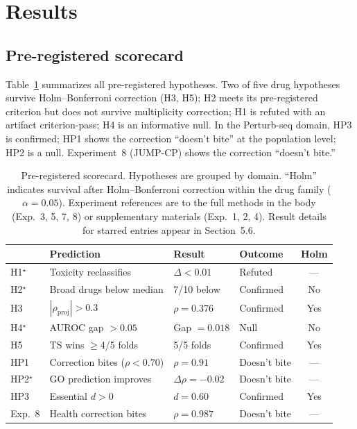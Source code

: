 \documentclass{article}
\begin{document}
\section{Results}

\subsection{Pre-registered scorecard}

Table~\ref{tab:scorecard} summarizes all pre-registered hypotheses.
Two of five drug hypotheses survive Holm--Bonferroni correction (H3, H5);
H2 meets its pre-registered criterion but does not survive multiplicity
correction; H1 is refuted with an artifact criterion-pass; H4 is an
informative null.
In the Perturb-seq domain, HP3 is confirmed; HP1 shows the correction
``doesn't bite'' at the population level; HP2 is a null. Experiment~8
(JUMP-CP) shows the correction ``doesn't bite.''

\begin{table}[t]
\centering
\caption{Pre-registered scorecard. Hypotheses are grouped by domain.
``Holm'' indicates survival after Holm--Bonferroni correction within
the drug family ($\alpha = 0.05$). Experiment references are to the
full methods in the body (Exp.~3, 5, 7, 8) or supplementary materials
(Exp.~1, 2, 4). Result details for starred entries appear in Section~5.6.}
\label{tab:scorecard}
\small
\begin{tabular}{llllc}
\toprule
 & Prediction & Result & Outcome & Holm \\
\midrule
H1$^\star$ & Toxicity reclassifies & $\Delta < 0.01$ & Refuted & --- \\
H2$^\star$ & Broad drugs below median & 7/10 below & Confirmed & No \\
H3 & $|\rho_{\text{proj}}| > 0.3$ & $\rho = 0.376$ & Confirmed & Yes \\
H4$^\star$ & AUROC gap $> 0.05$ & Gap $= 0.018$ & Null & No \\
H5 & TS wins $\geq$4/5 folds & 5/5 folds & Confirmed & Yes \\
\midrule
HP1 & Correction bites ($\rho < 0.70$) & $\rho = 0.91$ & Doesn't bite & --- \\
HP2$^\star$ & GO prediction improves & $\Delta\rho = -0.02$ & Doesn't bite & --- \\
HP3 & Essential $d > 0$ & $d = 0.60$ & Confirmed & Yes \\
\midrule
Exp.~8 & Health correction bites & $\rho = 0.987$ & Doesn't bite & --- \\
\bottomrule
\end{tabular}
\end{table}
\end{document}
